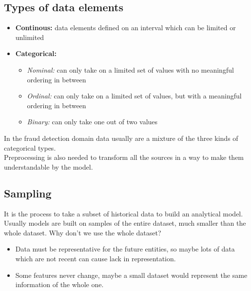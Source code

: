         \subsection{Types of data elements}
            \begin{itemize}
                \item \textbf{Continous:} data elements defined on an interval which can be limited or unlimited
                \item \textbf{Categorical:}
                \begin{itemize}
                    \item \textit{Nominal:} can only take on a limited set of values with no meaningful ordering in between
                    \item \textit{Ordinal:} can only take on a limited set of values, but with a meaningful ordering in between
                    \item \textit{Binary:} can only take one out of two values
                \end{itemize}
            \end{itemize}
            In the fraud detection domain data usually are a mixture of the three kinds of categorical types.\\
            Preprocessing is also needed to transform all the sources in a way to make them understandable by the model.
        \subsection{Sampling}
            It is the process to take a subset of historical data to build an analytical model. Usually models are built on samples of the entire dataset,
            much smaller than the whole dataset. Why don't we use the whole dataset?
            \begin{itemize}
                \item Data must be representative for the future entities, so maybe lots of data which are not recent can cause lack in representation.
                \item Some features never change, maybe a small dataset would represent the same information of the whole one.
            \end{itemize}
